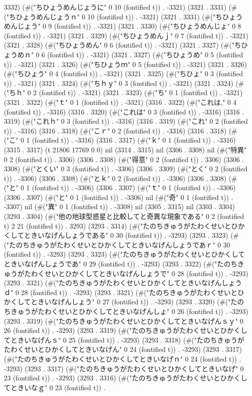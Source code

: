 3332) (#("ちひょうめんじょうに" 0 10 (fontified t)) . -3321) (3321 . 3331) (#("ちひょうめんじょうｎ" 0 10 (fontified t)) . -3321) (3321 . 3331) (#("ちひょうめんじょう" 0 9 (fontified t)) . -3321) (3321 . 3330) (#("ちひょうめんじょ" 0 8 (fontified t)) . -3321) (3321 . 3329) (#("ちひょうめんｊ" 0 7 (fontified t)) . -3321) (3321 . 3328) (#("ちひょうめん" 0 6 (fontified t)) . -3321) (3321 . 3327) (#("ちひょうめｎ" 0 6 (fontified t)) . -3321) (3321 . 3327) (#("ちひょうめ" 0 5 (fontified t)) . -3321) (3321 . 3326) (#("ちひょうｍ" 0 5 (fontified t)) . -3321) (3321 . 3326) (#("ちひょう" 0 4 (fontified t)) . -3321) (3321 . 3325) (#("ちひょ" 0 3 (fontified t)) . -3321) (3321 . 3324) (#("ちｈｙ" 0 3 (fontified t)) . -3321) (3321 . 3324) (#("ちｈ" 0 2 (fontified t)) . -3321) (3321 . 3323) (#("ち" 0 1 (fontified t)) . -3321) (3321 . 3322) (#("ｔ" 0 1 (fontified t)) . -3321) (3316 . 3322) (#("これは," 0 4 (fontified t)) . -3316) (3316 . 3320) (#("これは" 0 3 (fontified t)) . -3316) (3316 . 3319) (#("これｈ" 0 3 (fontified t)) . -3316) (3316 . 3319) (#("これ" 0 2 (fontified t)) . -3316) (3316 . 3318) (#("こｒ" 0 2 (fontified t)) . -3316) (3316 . 3318) (#("こ" 0 1 (fontified t)) . -3316) (3316 . 3317) (#("ｋ" 0 1 (fontified t)) . -3316) (3315 . 3317) (t 21806 17769 0 0) nil (3314 . 3315) nil (3306 . 3308) nil (#("特異" 0 2 (fontified t)) . 3306) (3306 . 3308) (#("得意" 0 2 (fontified t)) . 3306) (3306 . 3308) (#("とくい" 0 3 (fontified t)) . -3306) (3306 . 3309) (#("とく" 0 2 (fontified t)) . -3306) (3306 . 3308) (#("とｋ" 0 2 (fontified t)) . -3306) (3306 . 3308) (#("と" 0 1 (fontified t)) . -3306) (3306 . 3307) (#("ｔ" 0 1 (fontified t)) . -3306) (3306 . 3307) (#("と" 0 1 (fontified t)) . -3306) nil (#("奇" 0 1 (fontified t)) . -3307) nil (#("異" 0 1 (fontified t)) . -3308) nil (3305 . 3315) nil (3303 . 3304) (3293 . 3304) (#("他の地球型惑星と比較してと奇異な現象である" 0 2 (fontified t) 2 21 (fontified t)) . 3293) (3293 . 3314) (#("たのちきゅうがたわくせいとひかくしてときいなげんしょうである" 0 30 (fontified t)) . -3293) (3293 . 3323) (#("たのちきゅうがたわくせいとひかくしてときいなげんしょうであｒ" 0 30 (fontified t)) . -3293) (3293 . 3323) (#("たのちきゅうがたわくせいとひかくしてときいなげんしょうであ" 0 29 (fontified t)) . -3293) (3293 . 3322) (#("たのちきゅうがたわくせいとひかくしてときいなげんしょうで" 0 28 (fontified t)) . -3293) (3293 . 3321) (#("たのちきゅうがたわくせいとひかくしてときいなげんしょうｄ" 0 28 (fontified t)) . -3293) (3293 . 3321) (#("たのちきゅうがたわくせいとひかくしてときいなげんしょう" 0 27 (fontified t)) . -3293) (3293 . 3320) (#("たのちきゅうがたわくせいとひかくしてときいなげんしょ" 0 26 (fontified t)) . -3293) (3293 . 3319) (#("たのちきゅうがたわくせいとひかくしてときいなげんｓｙ" 0 26 (fontified t)) . -3293) (3293 . 3319) (#("たのちきゅうがたわくせいとひかくしてときいなげんｓ" 0 25 (fontified t)) . -3293) (3293 . 3318) (#("たのちきゅうがたわくせいとひかくしてときいなげん" 0 24 (fontified t)) . -3293) (3293 . 3317) (#("たのちきゅうがたわくせいとひかくしてときいなげｎ" 0 24 (fontified t)) . -3293) (3293 . 3317) (#("たのちきゅうがたわくせいとひかくしてときいなげ" 0 23 (fontified t)) . -3293) (3293 . 3316) (#("たのちきゅうがたわくせいとひかくしてときいなｇ" 0 23 (fontified t)) . 